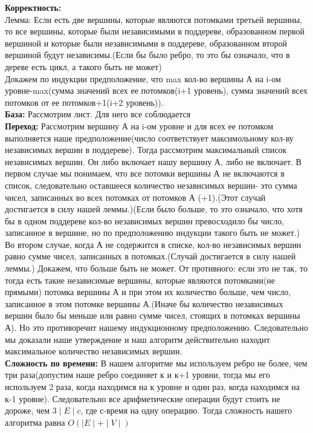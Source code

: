 \documentclass[a4paper,12pt]{article}
\begin{document}
\textbf{Корректность:} \\
Лемма: Если есть две вершины, которые являются потомками третьей вершины, то все вершины, которые были независимыми в поддереве, образованном первой вершиной и которые были независимыми в поддереве, образованном второй вершиной будут независимы.(Если бы было ребро, то это бы означало, что в дереве есть цикл, а такого быть не может)\\
Докажем по индукции предположение, что max кол-во вершины А на i-ом уровне-max(сумма значений всех ее потомков(i+1 уровень), сумма значений всех потомков от ее потомков+1(i+2 уровень)). \\

\textbf{База:} Рассмотрим лист. Для него все соблюдается\\
\textbf{Переход:} Рассмотрим вершину А на i-ом уровне и для всех ее потомком выполняется наше предположение(число соответствует максимольному кол-ву независимых вершин в поддереве). Тогда рассмотрим максимальный список независимых вершин. Он либо включает нашу вершину А, либо не включает. В первом случае мы понимаем, что все потомки вершины А не включаются в список, следовательно оставшееся количество независимых вершин- это сумма чисел, записанных во всех потомках от потомков А   (+1).(Этот случай достигается в силу нашей леммы.)(Если было больше, то это означало, что хотя бы в одном поддереве кол-во независимых вершин превосходило бы число, записанное в вершине, но по предположению индукции такого быть не может.) Во втором случае, когда А не содержится в списке, кол-во независимых вершин равно сумме чисел, записанных в потомках.(Случай достигается в силу нашей леммы.) Докажем, что больше быть не может. От противного: если это не так, то тогда есть такие независимые вершины, которые являются потомками(не прямыми) потомка вершины А и при этом их количество больше, чем число, записанное в этом потомке вершины А.(Иначе бы количество независимых вершин было бы меньше или равно сумме чисел, стоящих в потомках вершины А). Но это противоречит нашему индукционному предположению. Следовательно мы доказали наше утверждение и наш алгоритм действительно находит максимальное количество независимых вершин.\\
\textbf{Сложность по времени:} В нашем алгоритме мы используем ребро не более, чем три раза(допустим наше ребро соединяет к и к+1 уровни, тогда мы его используем 2 раза, когда находимся на к уровне и один раз, когда находимся на к-1 уровне). Следовательно все арифметические операции будут стоить не дороже, чем $3\mid E \mid c$, где с-время на одну операцию. Тогда сложность нашего алгоритма равна $O(\mid E \mid + \mid V \mid)$\\
\end{document}
